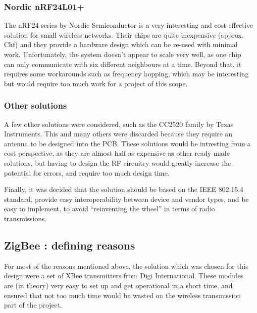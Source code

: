 \subsubsection{Nordic nRF24L01+}

The nRF24 series by Nordic Semiconductor is a
very interesting and cost-effective solution for small wireless networks. Their
chips are quite inexpensive (approx. \unit[7]{Chf}) and they provide a hardware
design which can be re-used with minimal work. Unfortunately, the system doesn't
appear to scale very well, as one chip can only communicate with six different
neighbours at a time. Beyond that, it requires some workarounds such as
frequency hopping, which may be interesting but would require too much work for
a project of this scope.

\subsubsection{Other solutions}

A few other solutions were considered, such as the CC2520 family by Texas
Instruments. This and many others were discarded because
they require an antenna to be designed into the PCB. These solutions would be
intresting from a cost perspective, as they are almost half as expensive as
other ready-made solutions, but having to design the RF circuitry would greatly
increase the potential for errors, and require too much design time. 

Finally, it was decided that the solution should be based on the IEEE 802.15.4
standard, provide easy interoperability between device and vendor types, and be
easy to implement, to avoid ``reinventing the wheel'' in terms of radio
transmissions.

\subsection{ZigBee : defining reasons}

For most of the reasons mentioned above, the solution which was chosen for this
design were a set of XBee transmitters from Digi
International. These modules are (in theory) very easy to
set up and get operational in a short time, and ensured that not too much time
would be wasted on the wireless transmission part of the project.

